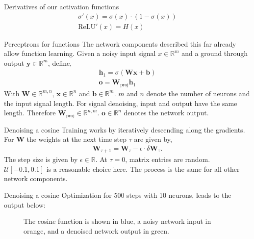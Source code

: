 \documentclass{beamer}
\begin{document}
    \begin{frame}{Derivatives of our activation functions}
      \begin{align}
        \sigma'(x) = \sigma(x) \cdot (1 - \sigma(x)) \\
        \text{ReLU}'(x) = H(x) 
      \end{align}
      \begin{figure}
        
        
      \end{figure}
    \end{frame}

    \begin{frame}{Perceptrons for functions}
      The network components described this far already allow function learning.
      Given a noisy input signal $x \in \mathbb{R}^{m}$ and a ground through output $\mathbf{y} \in \mathbb{R}^m$,
      define,
      \begin{align}
        \mathbf{h}_1 = \sigma(\mathbf{W}\mathbf{x} + \mathbf{b}) \\
        \mathbf{o} = \mathbf{W}_{\text{proj}}\mathbf{h}_1
      \end{align}
      With $\mathbf{W} \in \mathbb{R}^{m,n}$, $\mathbf{x} \in \mathbb{R}^{n}$ and $\mathbf{b} \in \mathbb{R}^{m}$.
      $m$ and $n$ denote the number of neurons and the input signal length.
      For signal denoising, input and output have the same length.
      Therefore $\mathbf{W}_{\text{proj}} \in \mathbb{R}^{n,m}$.
      $\mathbf{o} \in \mathbb{R}^{n}$ denotes the network output.
    \end{frame}

    \begin{frame}{Denoising a cosine}
      Training works by iteratively descending along the gradients. For $\mathbf{W}$ the weights at the
      next time step $\tau$ are given by,
      \begin{align}
        \mathbf{W}_{\tau + 1} = \mathbf{W}_\tau - \epsilon \cdot \delta\mathbf{W}_{\tau}.
      \end{align}
      The step size is given by $\epsilon \in \mathbb{R}$. At $\tau = 0$, matrix entries are random.
      $\mathcal{U}[-0.1, 0.1]$ is a reasonable choice here.
      The process is the same for all other network components.
    \end{frame}

    \begin{frame}{Denoising a cosine}
      Optimization for 500 steps with 10 neurons, leads to the output below:
      \begin{figure}
        
        \caption{The cosine function is shown in blue, a noisy network input in orange, and a denoised network output in green.}
        \end{figure}
    \end{frame}
\end{document}
